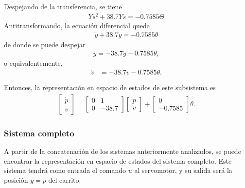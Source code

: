 Despejando de la transferencia, se tiene
\begin{align*}
    Ys^{2} + 38.7Ys = -0.7585 \Theta
\end{align*}
Antitransformando, la ecuación diferencial queda
\begin{align*}
    \ddot{y} + 38.7 \dot{y} = -0.7585 \theta
\end{align*}
de donde se puede despejar
\begin{align*}
    \ddot{y} = -38.7 \dot{y} - 0.7585 \theta,
\end{align*}
o equivalentemente,
\begin{align*}
    \dot{v} &= -38.7 v - 0.7585 \theta.
\end{align*}

Entonces, la representación en espacio de estados de este subsistema es
\begin{align*}
    \begin{bmatrix} \dot{p} \\ \dot{v} \end{bmatrix} =
        \begin{bmatrix} 0 & 1 \\ 0 & -38.7 \end{bmatrix} \begin{bmatrix} p \\ v \end{bmatrix}
        + \begin{bmatrix} 0 \\ - 0.7585 \end{bmatrix} \theta.
\end{align*}

\subsubsection{Sistema completo}

A partir de la concatenación de los sistemas anteriormente analizados, se puede encontrar la representación en espacio de estados del sistema completo. Este sistema tendrá como entrada el comando $u$ al servomotor, y su salida será la posición $y = p$ del carrito.

